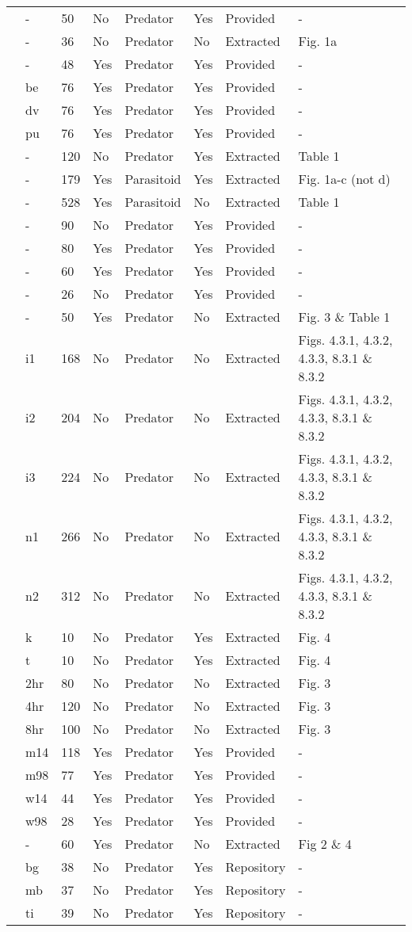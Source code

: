 \begin{longtable}{llllllll}
\citet{Long:2012aa}&-&50&No&Predator&Yes&Provided&-\tabularnewline
\citet{Mansour:1991aa}&-&36&No&Predator&No&Extracted&Fig. 1a\tabularnewline
\citet{Medoc:2013aa}&-&48&Yes&Predator&Yes&Provided&-\tabularnewline
\citet{Medoc:2015aa}&be&76&Yes&Predator&Yes&Provided&-\tabularnewline
\citet{Medoc:2015aa}&dv&76&Yes&Predator&Yes&Provided&-\tabularnewline
\citet{Medoc:2015aa}&pu&76&Yes&Predator&Yes&Provided&-\tabularnewline
\citet{Mertz:1968aa}&-&120&No&Predator&Yes&Extracted&Table 1\tabularnewline
\citet{Mills:2004aa}&-&179&Yes&Parasitoid&Yes&Extracted&Fig. 1a-c (not d)\tabularnewline
\citet{Montoya:2000aa}&-&528&Yes&Parasitoid&No&Extracted&Table 1\tabularnewline
\citet{Omkar:2004aa}&-&90&No&Predator&Yes&Provided&-\tabularnewline
\citet{Prokopenko:2017aa}&-&80&Yes&Predator&Yes&Provided&-\tabularnewline
\citet{Pusack:2018aa}&-&60&Yes&Predator&Yes&Provided&-\tabularnewline
\citet{Reeve:1997aa}&-&26&No&Predator&Yes&Provided&-\tabularnewline
\citet{Salt:1974aa}&-&50&Yes&Predator&No&Extracted&Fig. 3 \& Table 1\tabularnewline
\citet{Uttley:1980aa}&i1&168&No&Predator&No&Extracted&Figs. 4.3.1, 4.3.2, 4.3.3, 8.3.1 \& 8.3.2\tabularnewline
\citet{Uttley:1980aa}&i2&204&No&Predator&No&Extracted&Figs. 4.3.1, 4.3.2, 4.3.3, 8.3.1 \& 8.3.2\tabularnewline
\citet{Uttley:1980aa}&i3&224&No&Predator&No&Extracted&Figs. 4.3.1, 4.3.2, 4.3.3, 8.3.1 \& 8.3.2\tabularnewline
\citet{Uttley:1980aa}&n1&266&No&Predator&No&Extracted&Figs. 4.3.1, 4.3.2, 4.3.3, 8.3.1 \& 8.3.2\tabularnewline
\citet{Uttley:1980aa}&n2&312&No&Predator&No&Extracted&Figs. 4.3.1, 4.3.2, 4.3.3, 8.3.1 \& 8.3.2\tabularnewline
\citet{Vahl:2005aa}&k&10&No&Predator&Yes&Extracted&Fig. 4\tabularnewline
\citet{Vahl:2005aa}&t&10&No&Predator&Yes&Extracted&Fig. 4\tabularnewline
\citet{Von-Westernhagen:1976aa}&2hr&80&No&Predator&No&Extracted&Fig. 3\tabularnewline
\citet{Von-Westernhagen:1976aa}&4hr&120&No&Predator&No&Extracted&Fig. 3\tabularnewline
\citet{Von-Westernhagen:1976aa}&8hr&100&No&Predator&No&Extracted&Fig. 3\tabularnewline
\citet{Vucetich:2002aa}&m14&118&Yes&Predator&Yes&Provided&-\tabularnewline
\citet{Vucetich:2002aa}&m98&77&Yes&Predator&Yes&Provided&-\tabularnewline
\citet{Vucetich:2002aa}&w14&44&Yes&Predator&Yes&Provided&-\tabularnewline
\citet{Vucetich:2002aa}&w98&28&Yes&Predator&Yes&Provided&-\tabularnewline
\citet{Walde:1984aa}&-&60&Yes&Predator&No&Extracted&Fig 2 \& 4\tabularnewline
\citet{Wasserman:2016aa,Wasserman:2016ab}&bg&38&No&Predator&Yes&Repository&-\tabularnewline
\citet{Wasserman:2016aa,Wasserman:2016ab}&mb&37&No&Predator&Yes&Repository&-\tabularnewline
\citet{Wasserman:2016aa,Wasserman:2016ab}&ti&39&No&Predator&Yes&Repository&-\tabularnewline
\hline
\end{longtable}
